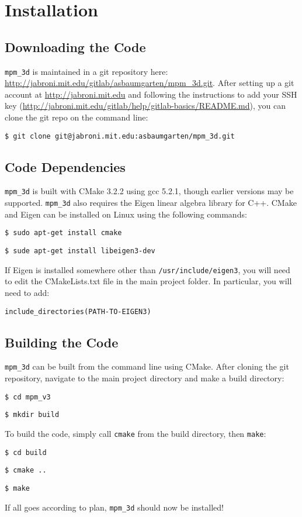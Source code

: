 \chapter{Installation}
\section{Downloading the Code}
\texttt{mpm\_3d} is maintained in a git repository here: \url{http://jabroni.mit.edu/gitlab/asbaumgarten/mpm\_3d.git}. After setting up a git account at \url{http://jabroni.mit.edu} and following the instructions to add your SSH key (\url{http://jabroni.mit.edu/gitlab/help/gitlab-basics/README.md}), you can clone the git repo on the command line:

\texttt{\$ git clone git@jabroni.mit.edu:asbaumgarten/mpm\_3d.git}


\section{Code Dependencies}
\texttt{mpm\_3d} is built with CMake 3.2.2 using gcc 5.2.1,
though earlier versions may be supported. \texttt{mpm\_3d} also requires the Eigen linear algebra library for C++. CMake and Eigen can be installed on Linux using the following commands:

\texttt{\$ sudo apt-get install cmake}

\texttt{\$ sude apt-get install libeigen3-dev}

If Eigen is installed somewhere other than \texttt{/usr/include/eigen3}, you will need to edit the CMakeLists.txt file in the main project folder. In particular, you will need to add:

\texttt{include\_directories(PATH-TO-EIGEN3)}


\section{Building the Code}
\texttt{mpm\_3d} can be built from the command line using CMake. After cloning the git repository, navigate to the main project directory and make a build directory:

\texttt{\$ cd mpm\_v3}

\texttt{\$ mkdir build}

To build the code, simply call \texttt{cmake} from the build directory, then \texttt{make}:

\texttt{\$ cd build}

\texttt{\$ cmake ..}

\texttt{\$ make}

If all goes according to plan, \texttt{mpm\_3d} should now be installed!